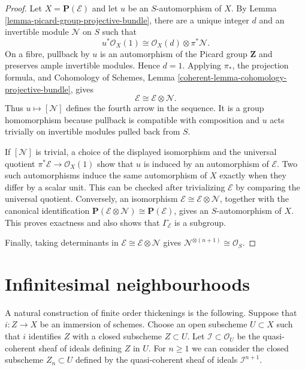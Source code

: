 \begin{proof}
Let $X = \mathbf{P}(\mathcal{E})$ and let $u$ be an $S$-automorphism of $X$.
By Lemma \ref{lemma-picard-group-projective-bundle}, there are a unique integer
$d$ and an invertible module $\mathcal{N}$ on $S$ such that
$$
u^*\mathcal{O}_X(1) \cong
\mathcal{O}_X(d) \otimes \pi^*\mathcal{N}.
$$
On a fibre, pullback by $u$ is an automorphism of the Picard group
$\mathbf{Z}$ and preserves ample invertible modules. Hence $d=1$. Applying
$\pi_*$, the projection formula, and Cohomology of Schemes, Lemma
\ref{coherent-lemma-cohomology-projective-bundle}, gives
$$
\mathcal{E} \cong \mathcal{E} \otimes \mathcal{N}.
$$
Thus $u \mapsto [\mathcal{N}]$ defines the fourth arrow in the sequence. It is
a group homomorphism because pullback is compatible with composition and
$u$ acts trivially on invertible modules pulled back from $S$.

If $[\mathcal{N}]$ is trivial, a choice of the displayed isomorphism and the
universal quotient $\pi^*\mathcal{E} \to \mathcal{O}_X(1)$ show that $u$ is
induced by an automorphism of $\mathcal{E}$. Two such automorphisms induce the
same automorphism of $X$ exactly when they differ by a scalar unit. This can
be checked after trivializing $\mathcal{E}$ by comparing the universal
quotient. Conversely, an isomorphism
$\mathcal{E} \cong \mathcal{E} \otimes \mathcal{N}$, together with the
canonical identification
$\mathbf{P}(\mathcal{E} \otimes \mathcal{N}) \cong
\mathbf{P}(\mathcal{E})$, gives an $S$-automorphism of $X$. This proves
exactness and also shows that $\Gamma_{\mathcal{E}}$ is a subgroup.

Finally, taking determinants in
$\mathcal{E} \cong \mathcal{E} \otimes \mathcal{N}$ gives
$\mathcal{N}^{\otimes(n + 1)} \cong \mathcal{O}_S$.
\end{proof}



\section{Infinitesimal neighbourhoods}
\label{section-first-order-infinitesimal-neighbourhood}

\noindent
A natural construction of finite order thickenings is the following.
Suppose that $i : Z \to X$ be an immersion of schemes. Choose an
open subscheme $U \subset X$ such that $i$ identifies $Z$ with a closed
subscheme $Z \subset U$. Let $\mathcal{I} \subset \mathcal{O}_U$ be the
quasi-coherent sheaf of ideals defining $Z$ in $U$. For $n \geq 1$
we can consider the closed subscheme $Z_n \subset U$
defined by the quasi-coherent sheaf of ideals $\mathcal{I}^{n + 1}$.

